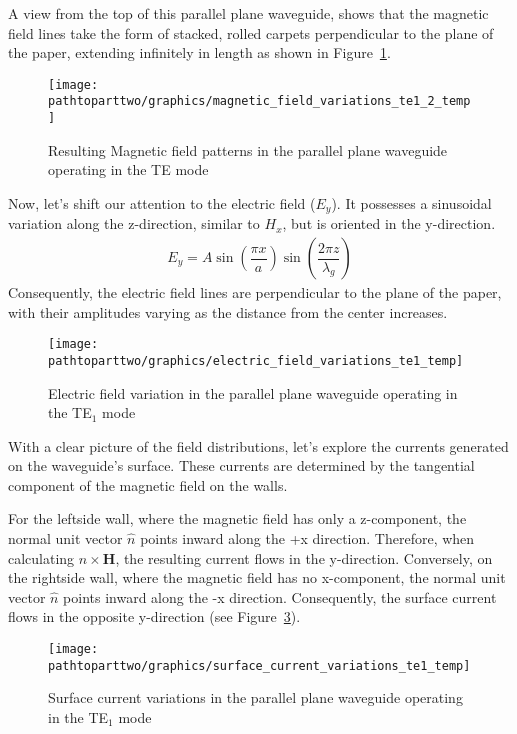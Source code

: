 A view from the top of this parallel plane waveguide, shows that the magnetic field lines take the form of stacked, rolled carpets perpendicular to the plane of the paper, extending infinitely in length as shown in Figure~\ref{fig:magnetic_field_variation}.
\begin{figure}[h]
\centering
\texttt{[image: \\pathtoparttwo/graphics/magnetic\_field\_variations\_te1\_2\_temp]}
\caption{Resulting Magnetic field patterns in the parallel plane waveguide operating in the TE mode}
\label{fig:magnetic_field_variation}
\end{figure}

Now, let's shift our attention to the electric field ($E_y$). It possesses a sinusoidal variation along the z-direction, similar to $H_x$, but is oriented in the y-direction.
\begin{align*}
E_y= A\sin(\dfrac{\pi x}{a})\sin(\dfrac{2\pi z}{\lambda_g})
\end{align*}
Consequently, the electric field lines are perpendicular to the plane of the paper, with their amplitudes varying as the distance from the center increases.
\begin{figure}[h]
\centering
\texttt{[image: \\pathtoparttwo/graphics/electric\_field\_variations\_te1\_temp]}
\caption{Electric field variation in the parallel plane waveguide operating in the TE$_1$ mode}
\label{fig:electric_field_variation}
\end{figure}

With a clear picture of the field distributions, let's explore the currents generated on the waveguide's surface. These currents are determined by the tangential component of the magnetic field on the walls.

For the leftside wall, where the magnetic field has only a z-component, the normal unit vector $\hat{n}$ points inward along the +x direction. Therefore, when calculating $\hat{n} \times \boldsymbol{H}$, the resulting current flows in the y-direction. Conversely, on the rightside wall, where the magnetic field has no x-component, the normal unit vector $\hat{n}$ points inward along the -x direction. Consequently, the surface current flows in the opposite y-direction (see Figure~\ref{fig:surface_current_variation}).
\begin{figure}[h]
\centering
\texttt{[image: \\pathtoparttwo/graphics/surface\_current\_variations\_te1\_temp]}
\caption{Surface current variations in the parallel plane waveguide operating in the TE$_1$ mode}
\label{fig:surface_current_variation}
\end{figure}

